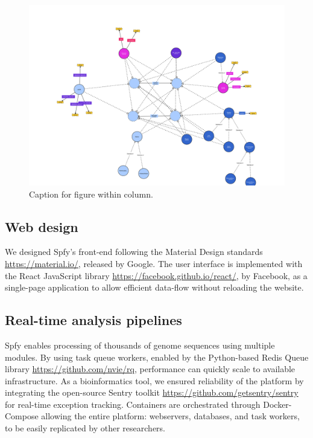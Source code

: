 \documentclass[a4,center,fleqn]{NAR}
\begin{document}
\begin{figure}[t]
\begin{center}
\includegraphics{images/spfy_ontology-1.svg}
\end{center}
\caption{Caption for figure within column.}
\label{fig-ontology}
\end{figure}

\subsection{Web design}

We designed Spfy's front-end following the Material Design standards \url{https://material.io/}, released by Google.
The user interface is implemented with the React JavaScript library \url{https://facebook.github.io/react/}, by Facebook, as a single-page application to allow efficient data-flow without reloading the website.

\subsection{Real-time analysis pipelines}

Spfy enables processing of thousands of genome sequences using multiple modules.
By using task queue workers, enabled by the Python-based Redis Queue library \url{https://github.com/nvie/rq}, performance can quickly scale to available infrastructure.
As a bioinformatics tool, we ensured reliability of the platform by integrating the open-source Sentry toolkit \url{https://github.com/getsentry/sentry} for real-time exception tracking.
Containers are orchestrated through Docker-Compose allowing the entire platform: webservers, databases, and task workers, to be easily replicated by other researchers.
\end{document}
